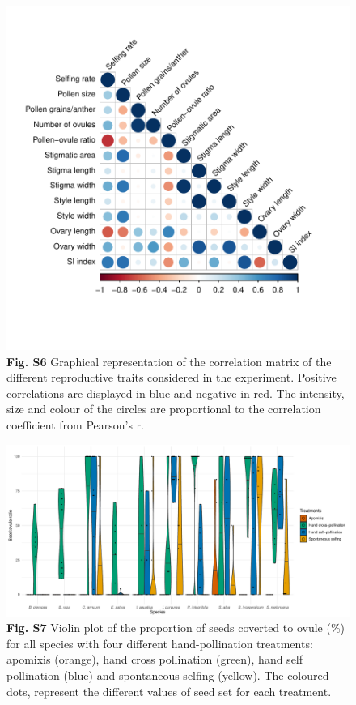 \documentclass[
  12pt,
]{article}
\begin{document}
\begin{figure}
\centering
\includegraphics{Supp_Material_files/figure-latex/unnamed-chunk-9-1.pdf}
\caption{\textbf{Fig. S6} Graphical representation of the correlation
matrix of the different reproductive traits considered in the
experiment. Positive correlations are displayed in blue and negative in
red. The intensity, size and colour of the circles are proportional to
the correlation coefficient from Pearson's r.}
\end{figure}

\clearpage

\begin{figure}
\centering
\includegraphics{Supp_Material_files/figure-latex/unnamed-chunk-10-1.pdf}
\caption{\textbf{Fig. S7} Violin plot of the proportion of seeds
coverted to ovule (\%) for all species with four different
hand-pollination treatments: apomixis (orange), hand cross pollination
(green), hand self pollination (blue) and spontaneous selfing (yellow).
The coloured dots, represent the different values of seed set for each
treatment.}
\end{figure}
\end{document}
